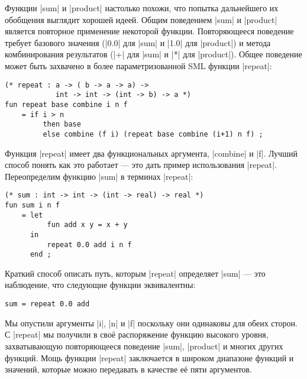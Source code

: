 Функции \inline|sum| и \inline|product| настолько похожи, что попытка дальнейшего их обобщения выглядит хорошей идеей. Общим поведением \inline|sum| и \inline|product| является повторное применение некоторой функции. Повторяющееся поведение требует базового значения (\inline|0.0| для \inline|sum| и \inline|1.0| для \inline|product|) и метода комбинирования результатов (\inline|+| для \inline|sum| и \inline|*| для \inline|product|). Общее поведение может быть захвачено в более параметризованной SML функции \inline|repeat|:

\begin{lstlisting}[style=customml]
(* repeat : a -> ( b -> a -> a) ->
            int -> int -> (int -> b) -> a *)
fun repeat base combine i n f
    = if i > n
         then base
         else combine (f i) (repeat base combine (i+1) n f) ;
\end{lstlisting}

Функция \inline|repeat| имеет два функциональных аргумента, \inline|combine| и \inline|f|. Лучший способ понять как это работает --- это дать пример использования \inline|repeat|. Переопределим функцию \inline|sum| в терминах \inline|repeat|:

\begin{lstlisting}[style=customml]
(* sum : int -> int -> (int -> real) -> real *)
fun sum i n f
    = let
          fun add x y = x + y
      in
          repeat 0.0 add i n f
      end ;
\end{lstlisting}

Краткий способ описать путь, которым \inline|repeat| определяет \inline|sum| --- это наблюдение, что следующие функции эквивалентны:

\begin{lstlisting}[style=customml]
sum = repeat 0.0 add
\end{lstlisting}

Мы опустили аргументы \inline|i|, \inline|n| и \inline|f| поскольку они одинаковы для обеих сторон. С \inline|repeat| мы получили в своё распоряжение функцию высокого уровня, захватывающую повторяющееся поведение \inline|sum|, \inline|product| и многих других функций. Мощь функции \inline|repeat| заключается в широком диапазоне функций и значений, которые можно передавать в качестве её пяти аргументов.



